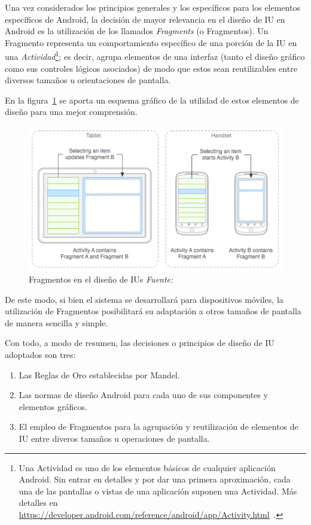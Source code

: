 Una vez considerados los principios generales y los específicos para los elementos específicos de Android, la decisión de mayor relevancia en el diseño de IU en Android es la utilización de los llamados \emph{Fragments} (o Fragmentos). Un Fragmento representa un comportamiento específico de una porción de la IU en una \emph{Actividad}\footnote{Una Actividad es uno de los elementos básicos de cualquier aplicación Android. Sin entrar en detalles y por dar una primera aproximación, cada una de las pantallas o vistas de una aplicación suponen una Actividad. Más detalles en \url{https://developer.android.com/reference/android/app/Activity.html}~\cite{AnDev}.}; es decir, agrupa elementos de una interfaz (tanto el diseño gráfico como sus controles lógicos asociados) de modo que estos sean reutilizables entre diversos tamaños u orientaciones de pantalla.

En la figura~\ref{fig:fragmentsAndroid} se aporta un esquema gráfico de la utilidad de estos elementos de diseño para una mejor comprensión.

\begin{figure} [!htb]
	\centering
	\includegraphics[width=\linewidth,height=\textheight,keepaspectratio]{Images/FragmentsAndroid}
	\caption{Fragmentos en el diseño de IUs \textit{Fuente:~\cite{AnDev}}}
	\label{fig:fragmentsAndroid}
\end{figure}

De este modo, si bien el sistema se desarrollará para dispositivos móviles, la utilización de Fragmentos posibilitará su adaptación a otros tamaños de pantalla de manera sencilla y simple.

Con todo, a modo de resumen, las decisiones o principios de diseño de IU adoptados son tres:

\begin{enumerate}
	\item{Las Reglas de Oro establecidas por Mandel}.
	\item{Las normas de diseño Android para cada uno de sus componentes y elementos gráficos}.
	\item{El empleo de Fragmentos para la agrupación y reutilización de elementos de IU entre diveros tamaños u operaciones de pantalla}.
\end{enumerate}

